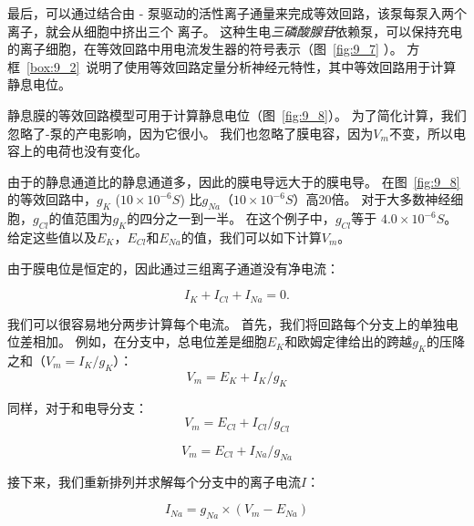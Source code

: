 最后，可以通过结合由 - 泵驱动的活性离子通量来完成等效回路，该泵每泵入两个  离子，就会从细胞中挤出三个  离子。
这种生电\textit{三磷酸腺苷}依赖泵，可以保持充电的离子细胞，在等效回路中用电流发生器的符号表示（图~\ref{fig:9_7} ）。
方框~\ref{box:9_2}~说明了使用等效回路定量分析神经元特性，其中等效回路用于计算静息电位。


\begin{proposition}[利用等效回路模型计算静息膜电位] \label{box:9_2}
	
	\quad \quad 静息膜的等效回路模型可用于计算静息电位（图~\ref{fig:9_8}）。
	为了简化计算，我们忽略了-泵的产电影响，因为它很小。
	我们也忽略了膜电容，因为$V_m$不变，所以电容上的电荷也没有变化。
	
	\quad \quad 由于的静息通道比的静息通道多，因此的膜电导远大于的膜电导。
	在图~\ref{fig:9_8}的等效回路中，$ g_K $ ($ 10\times 10^{-6} S $) 比$ g_{Na} $（$ 10 \times 10^{-6} S $）高20倍。
	对于大多数神经细胞，$ g_{Cl} $的值范围为$ g_K $的四分之一到一半。
	在这个例子中，$ g_{Cl} $等于 $ 4.0 \times 10^{-6} S $。
	给定这些值以及$E_K$，$E_{Cl}$和$ E_{Na} $的值，我们可以如下计算$V_m$。
	
	\quad \quad 由于膜电位是恒定的，因此通过三组离子通道没有净电流：
	
	\begin{equation}\label{eq:9_three_sets}
		I_K + I_{Cl} + I_{Na} = 0.
	\end{equation}
	
	\quad \quad 我们可以很容易地分两步计算每个电流。
	首先，我们将回路每个分支上的单独电位差相加。
	例如，在分支中，总电位差是细胞$E_K$和欧姆定律给出的跨越$ g_K $的压降之和（$ V_m = I_K / g_K $）：
	\begin{equation}\label{eq:9_voltage_drop}
		V_m = E_K + I_K / g_K
	\end{equation}
	
	\quad \quad 同样，对于和电导分支：
	\begin{equation}\label{eq:9_Na_conductance}
		V_m = E_{Cl} + I_{Cl} / g_{Cl}
	\end{equation}
	
	\begin{equation}\label{eq:9_Cl_conductance}
		V_m = E_{Cl} + I_{Na} / g_{Na}
	\end{equation}
	
	\quad \quad 接下来，我们重新排列并求解每个分支中的离子电流$ I $：
	
	\begin{equation}\label{eq:9_ionic_current_Na}
		I_{Na} = g_{Na} \times (V_m - E_{Na})
	\end{equation}


\end{proposition}
